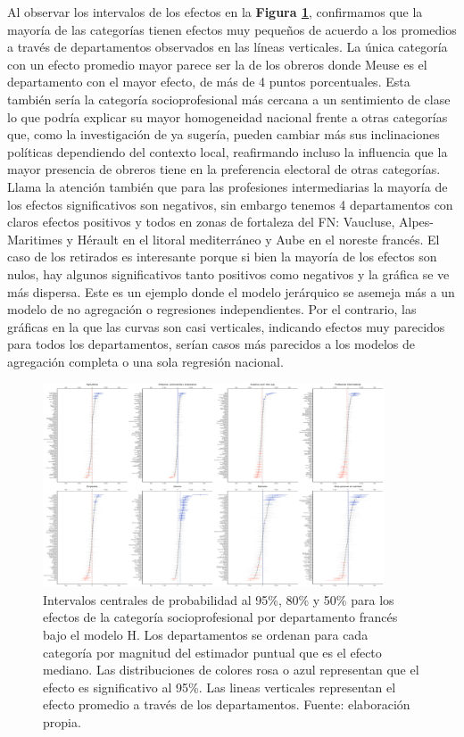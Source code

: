 Al observar los intervalos de los efectos en la \textbf{Figura \ref{fig:Efectos_Cat_Socioprof}}, confirmamos que la mayoría de las categorías tienen efectos muy pequeños de acuerdo a los promedios a través de departamentos observados en las líneas verticales. La única categoría con un efecto promedio mayor parece ser la de los obreros donde Meuse es el departamento con el mayor efecto, de más de 4 puntos porcentuales. Esta también sería la categoría socioprofesional más cercana a un sentimiento de clase lo que podría explicar su mayor homogeneidad nacional frente a otras categorías que, como la investigación de \textcite{MayerMichelat81} ya sugería, pueden cambiar más sus inclinaciones políticas dependiendo del contexto local, reafirmando incluso la influencia que la mayor presencia de obreros tiene en la preferencia electoral de otras categorías.\\ 

Llama la atención también que para las profesiones intermediarias la mayoría de los efectos significativos son negativos, sin embargo tenemos 4 departamentos con claros efectos positivos y todos en zonas de fortaleza del FN: Vaucluse, Alpes-Maritimes y Hérault en el litoral mediterráneo y Aube en el noreste francés. El caso de los retirados es interesante porque si bien la mayoría de los efectos son nulos, hay algunos significativos tanto positivos como negativos y la gráfica se ve más dispersa. Este es un ejemplo donde el modelo jerárquico se asemeja más a un modelo de no agregación o regresiones independientes. Por el contrario, las gráficas en la que las curvas son casi verticales, indicando efectos muy parecidos para todos los departamentos, serían casos más parecidos a los modelos de agregación completa o una sola regresión nacional.\\ 

\begin{figure}[h]
	\centering
	\includegraphics[width = 0.9\textwidth]{Figs/Efectos/Efectos_Cat_Socioprof_Modelo_H}
	\caption{Intervalos centrales de probabilidad al 95\%, 80\% y 50\% para los efectos de la categoría socioprofesional por departamento francés bajo el modelo H. Los departamentos se ordenan para cada categoría por magnitud del estimador puntual que es el efecto mediano. Las distribuciones de colores rosa o azul representan que el efecto es significativo al 95\%. Las lineas verticales representan el efecto promedio a través de los departamentos. Fuente: elaboración propia.}
	\label{fig:Efectos_Cat_Socioprof}
\end{figure}

